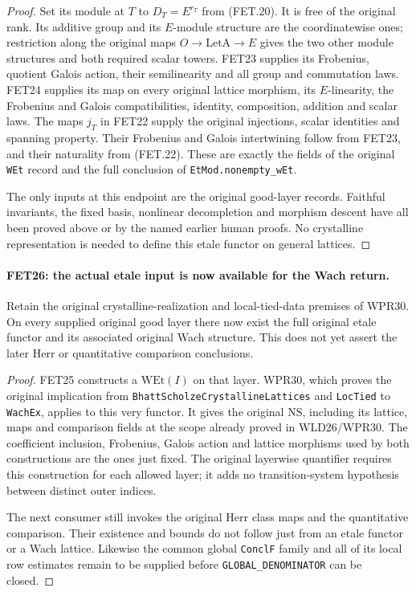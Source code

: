 \begin{proof}
Set its module at $T$ to $D_T=E^{r_T}$ from (FET.20).
It is free of the original rank. Its additive group and its
$E$-module structure are the coordinatewise ones; restriction
along the original maps $O\to\mathrm{LetA}\to E$ gives the
two other module structures and both required scalar towers.
FET23 supplies its Frobenius,
quotient Galois action, their semilinearity and all group and
commutation laws. FET24 supplies its map on every original
lattice morphism, its $E$-linearity, the Frobenius and Galois
compatibilities, identity, composition, addition and scalar laws.
The maps $j_T$ in FET22 supply the original injections, scalar
identities and spanning property. Their Frobenius and Galois
intertwining follow from FET23, and their naturality from
(FET.22). These are exactly the fields of the original
\texttt{WEt} record and the full conclusion of
\texttt{EtMod.nonempty\_wEt}.

The only inputs at this endpoint are the original good-layer
records. Faithful invariants, the fixed basis, nonlinear
decompletion and morphism descent have all been proved above or
by the named earlier human proofs. No crystalline representation
is needed to define this etale functor on general lattices.
\end{proof}

\paragraph{FET26: the actual etale input is now available for the Wach return.}
\label{claim:FET26}
Retain the original crystalline-realization and local-tied-data
premises of WPR30. On every supplied original good layer there
now exist the full original etale functor and its associated
original Wach structure. This does not yet assert the later
Herr or quantitative comparison conclusions.

\begin{proof}
FET25 constructs a $\mathrm{WEt}(I)$ on that layer. WPR30,
which proves the original implication from
\texttt{BhattScholzeCrystallineLattices} and \texttt{LocTied}
to \texttt{WachEx}, applies to this very functor. It gives
the original $\mathrm{NS}$, including its lattice, maps and
comparison fields at the scope already proved in WLD26/WPR30.
The coefficient inclusion, Frobenius, Galois action and lattice
morphisms used by both constructions are the ones just fixed.
The original layerwise quantifier requires this construction for
each allowed layer; it adds no transition-system hypothesis
between distinct outer indices.

The next consumer still invokes the original Herr class maps
and the quantitative comparison. Their existence and bounds do
not follow just from an etale functor or a Wach lattice. Likewise
the common global \texttt{ConclF} family and all of its local
row estimates remain to be supplied before
\texttt{GLOBAL\_DENOMINATOR} can be closed.
\end{proof}

